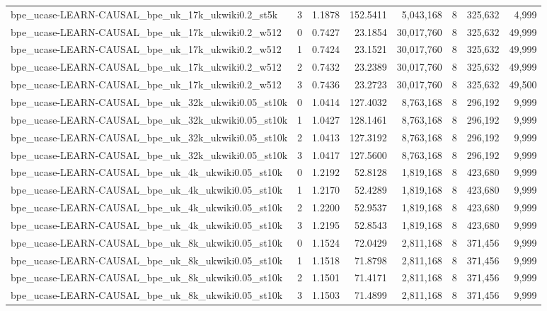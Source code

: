 \begin{tabular}{lrrrrrrr}
bpe\_ucase-LEARN-CAUSAL\_bpe\_uk\_17k\_ukwiki0.2\_st5k & 3 & 1.1878 & 152.5411 & 5,043,168 & 8 & 325,632 & 4,999 \\
bpe\_ucase-LEARN-CAUSAL\_bpe\_uk\_17k\_ukwiki0.2\_w512 & 0 & 0.7427 & 23.1854 & 30,017,760 & 8 & 325,632 & 49,999 \\
bpe\_ucase-LEARN-CAUSAL\_bpe\_uk\_17k\_ukwiki0.2\_w512 & 1 & 0.7424 & 23.1521 & 30,017,760 & 8 & 325,632 & 49,999 \\
bpe\_ucase-LEARN-CAUSAL\_bpe\_uk\_17k\_ukwiki0.2\_w512 & 2 & 0.7432 & 23.2389 & 30,017,760 & 8 & 325,632 & 49,999 \\
bpe\_ucase-LEARN-CAUSAL\_bpe\_uk\_17k\_ukwiki0.2\_w512 & 3 & 0.7436 & 23.2723 & 30,017,760 & 8 & 325,632 & 49,500 \\
bpe\_ucase-LEARN-CAUSAL\_bpe\_uk\_32k\_ukwiki0.05\_st10k & 0 & 1.0414 & 127.4032 & 8,763,168 & 8 & 296,192 & 9,999 \\
bpe\_ucase-LEARN-CAUSAL\_bpe\_uk\_32k\_ukwiki0.05\_st10k & 1 & 1.0427 & 128.1461 & 8,763,168 & 8 & 296,192 & 9,999 \\
bpe\_ucase-LEARN-CAUSAL\_bpe\_uk\_32k\_ukwiki0.05\_st10k & 2 & 1.0413 & 127.3192 & 8,763,168 & 8 & 296,192 & 9,999 \\
bpe\_ucase-LEARN-CAUSAL\_bpe\_uk\_32k\_ukwiki0.05\_st10k & 3 & 1.0417 & 127.5600 & 8,763,168 & 8 & 296,192 & 9,999 \\
bpe\_ucase-LEARN-CAUSAL\_bpe\_uk\_4k\_ukwiki0.05\_st10k & 0 & 1.2192 & 52.8128 & 1,819,168 & 8 & 423,680 & 9,999 \\
bpe\_ucase-LEARN-CAUSAL\_bpe\_uk\_4k\_ukwiki0.05\_st10k & 1 & 1.2170 & 52.4289 & 1,819,168 & 8 & 423,680 & 9,999 \\
bpe\_ucase-LEARN-CAUSAL\_bpe\_uk\_4k\_ukwiki0.05\_st10k & 2 & 1.2200 & 52.9537 & 1,819,168 & 8 & 423,680 & 9,999 \\
bpe\_ucase-LEARN-CAUSAL\_bpe\_uk\_4k\_ukwiki0.05\_st10k & 3 & 1.2195 & 52.8543 & 1,819,168 & 8 & 423,680 & 9,999 \\
bpe\_ucase-LEARN-CAUSAL\_bpe\_uk\_8k\_ukwiki0.05\_st10k & 0 & 1.1524 & 72.0429 & 2,811,168 & 8 & 371,456 & 9,999 \\
bpe\_ucase-LEARN-CAUSAL\_bpe\_uk\_8k\_ukwiki0.05\_st10k & 1 & 1.1518 & 71.8798 & 2,811,168 & 8 & 371,456 & 9,999 \\
bpe\_ucase-LEARN-CAUSAL\_bpe\_uk\_8k\_ukwiki0.05\_st10k & 2 & 1.1501 & 71.4171 & 2,811,168 & 8 & 371,456 & 9,999 \\
bpe\_ucase-LEARN-CAUSAL\_bpe\_uk\_8k\_ukwiki0.05\_st10k & 3 & 1.1503 & 71.4899 & 2,811,168 & 8 & 371,456 & 9,999 \\

\end{tabular}
